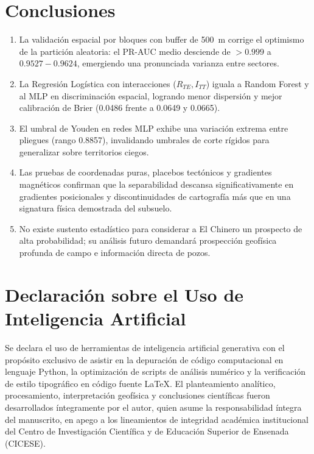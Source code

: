 \documentclass[10pt,twocolumn,a4paper]{article}
\begin{document}
\section{Conclusiones}
\begin{enumerate}
\itemsep0pt  
\item La validación espacial por bloques con buffer de 500~m corrige el optimismo de la partición aleatoria: el PR-AUC medio desciende de $>0.999$ a $0.9527 - 0.9624$, emergiendo una pronunciada varianza entre sectores.
\item La Regresión Logística con interacciones ($R_{TE}, I_{TT}$) iguala a Random Forest y al MLP en discriminación espacial, logrando menor dispersión y mejor calibración de Brier (0.0486 frente a 0.0649 y 0.0665).
\item El umbral de Youden en redes MLP exhibe una variación extrema entre pliegues (rango 0.8857), invalidando umbrales de corte rígidos para generalizar sobre territorios ciegos.
\item Las pruebas de coordenadas puras, placebos tectónicos y gradientes magnéticos confirman que la separabilidad descansa significativamente en gradientes posicionales y discontinuidades de cartografía más que en una signatura física demostrada del subsuelo.
\item No existe sustento estadístico para considerar a El Chinero un prospecto de alta probabilidad; su análisis futuro demandará prospección geofísica profunda de campo e información directa de pozos.
\end{enumerate}

\clearpage
\onecolumn

\section*{Declaración sobre el Uso de Inteligencia Artificial}
\vspace{0.25cm}
\noindent Se declara el uso de herramientas de inteligencia artificial generativa con el propósito exclusivo de asistir en la depuración de código computacional en lenguaje Python, la optimización de scripts de análisis numérico y la verificación de estilo tipográfico en código fuente \LaTeX. El planteamiento analítico, procesamiento, interpretación geofísica y conclusiones científicas fueron desarrollados íntegramente por el autor, quien asume la responsabilidad íntegra del manuscrito, en apego a los lineamientos de integridad académica institucional del Centro de Investigación Científica y de Educación Superior de Ensenada (CICESE).
\end{document}
